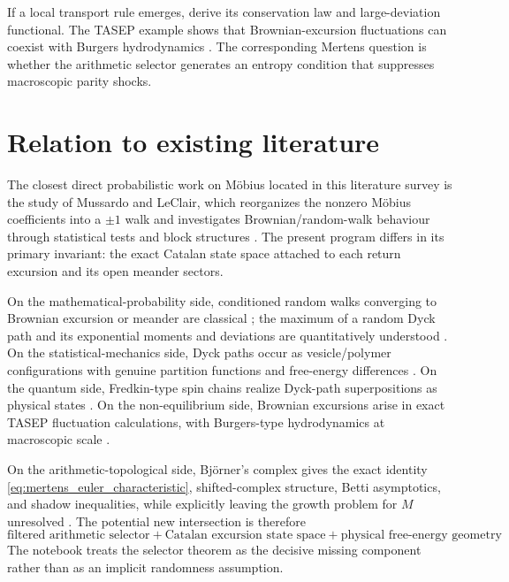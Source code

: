 \documentclass[11pt]{amsart}
\numberwithin{equation}{section}
\theoremstyle{plain}
\theoremstyle{definition}
\theoremstyle{remark}
\newcommand{\Mert}{M}
\begin{document}
If a local transport rule emerges, derive its conservation law and large-deviation functional.  The TASEP example shows that Brownian-excursion fluctuations can coexist with Burgers hydrodynamics \cite{DerridaEnaudLebowitz2004}.  The corresponding Mertens question is whether the arithmetic selector generates an entropy condition that suppresses macroscopic parity shocks.

\section{Relation to existing literature}
\label{sec:literature_position}

The closest direct probabilistic work on M\"obius located in this literature survey is the study of Mussardo and LeClair, which reorganizes the nonzero M\"obius coefficients into a $\pm1$ walk and investigates Brownian/random-walk behaviour through statistical tests and block structures \cite{MussardoLeClair2021}.  The present program differs in its primary invariant: the exact Catalan state space attached to each return excursion and its open meander sectors.

On the mathematical-probability side, conditioned random walks converging to Brownian excursion or meander are classical \cite{Kaigh1976,DurrettIglehartMiller1977,CsakiMohanty1981}; the maximum of a random Dyck path and its exponential moments and deviations are quantitatively understood \cite{KhorunzhiyMarckert2009,Kousha2012}.  On the statistical-mechanics side, Dyck paths occur as vesicle/polymer configurations with genuine partition functions and free-energy differences \cite{OwczarekPrellberg2014,HaugPrellberg2015}.  On the quantum side, Fredkin-type spin chains realize Dyck-path superpositions as physical states \cite{DellAnnaEtAl2016,SalbergerKorepin2017}.  On the non-equilibrium side, Brownian excursions arise in exact TASEP fluctuation calculations, with Burgers-type hydrodynamics at macroscopic scale \cite{DerridaEnaudLebowitz2004}.

On the arithmetic-topological side, Bj\"orner's complex gives the exact identity \eqref{eq:mertens_euler_characteristic}, shifted-complex structure, Betti asymptotics, and shadow inequalities, while explicitly leaving the growth problem for $\Mert$ unresolved \cite{Bjorner2011}.  The potential new intersection is therefore
\begin{equation}
\boxed{
\text{filtered arithmetic selector}
+
\text{Catalan excursion state space}
+
\text{physical free-energy geometry}
}.
\label{eq:literature_intersection}
\end{equation}
The notebook treats the selector theorem as the decisive missing component rather than as an implicit randomness assumption.
\end{document}
